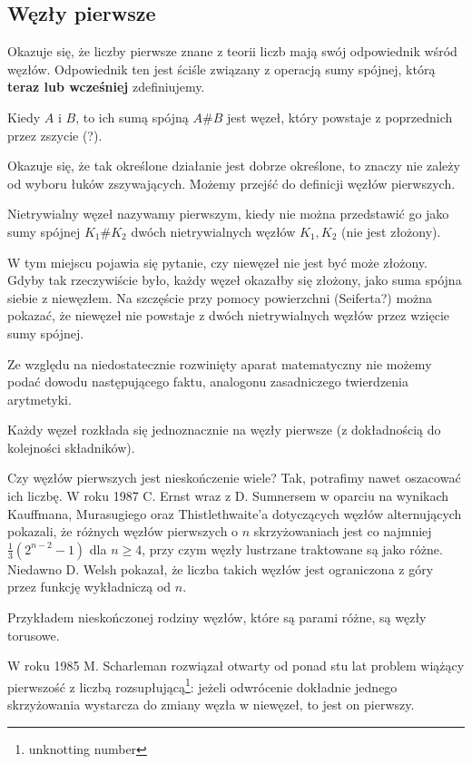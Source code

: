 \subsection{Węzły pierwsze}

Okazuje się, że liczby pierwsze znane z teorii liczb mają swój odpowiednik wśród węzłów.
Odpowiednik ten jest ściśle związany z operacją sumy spójnej, którą {\bf \color{red} teraz lub wcześniej} zdefiniujemy.

\begin{definicja}
Kiedy $A$ i $B$, to ich sumą spójną $A \# B$ jest węzeł, który powstaje z poprzednich przez zszycie (?).
\end{definicja}

Okazuje się, że tak określone działanie jest dobrze określone, to znaczy nie zależy od wyboru łuków zszywających.
Możemy przejść do definicji węzłów pierwszych.

\begin{definicja}
Nietrywialny węzeł nazywamy pierwszym, kiedy nie można przedstawić go jako sumy spójnej $K_1 \# K_2$ dwóch nietrywialnych węzłów $K_1, K_2$ (nie jest złożony).
\end{definicja}

W tym miejscu pojawia się pytanie, czy niewęzeł nie jest być może złożony.
Gdyby tak rzeczywiście było, każdy węzeł okazałby się złożony, jako suma spójna siebie z niewęzłem.
Na szczęście przy pomocy powierzchni (Seiferta?) można pokazać, że niewęzeł nie powstaje z dwóch nietrywialnych węzłów przez wzięcie sumy spójnej.

Ze względu na niedostatecznie rozwinięty aparat matematyczny nie możemy podać dowodu następującego faktu, analogonu zasadniczego twierdzenia arytmetyki.

\begin{twierdzenie}[Schubert, 1949]
Każdy węzeł rozkłada się jednoznacznie na węzły pierwsze (z dokładnością do kolejności składników).
\end{twierdzenie}

Czy węzłów pierwszych jest nieskończenie wiele?
Tak, potrafimy nawet oszacować ich liczbę.
W roku 1987 C. Ernst wraz z D. Sumnersem w oparciu na wynikach Kauffmana, Murasugiego oraz Thistlethwaite'a dotyczących węzłów alternujących pokazali, że różnych węzłów pierwszych o $n$ skrzyżowaniach jest co najmniej $\frac 1 3 (2^{n- 2} - 1)$ dla $n \ge 4$, przy czym węzły lustrzane traktowane są jako różne.
Niedawno D. Welsh pokazał, że liczba takich węzłów jest ograniczona z góry przez funkcję wykładniczą od $n$.

Przykładem nieskończonej rodziny węzłów, które są parami różne, są węzły torusowe.

W roku 1985 M. Scharleman rozwiązał otwarty od ponad stu lat problem wiążący pierwszość z liczbą rozsupłującą\footnote{unknotting number}: jeżeli odwrócenie dokładnie jednego skrzyżowania wystarcza do zmiany węzła w niewęzeł, to jest on pierwszy.
